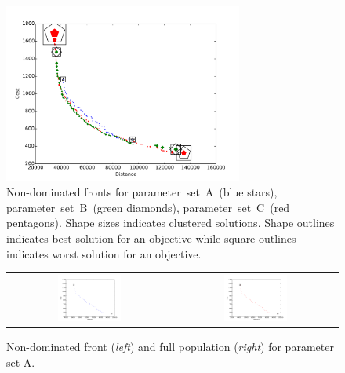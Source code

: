 \documentclass[paper=a4, fontsize=10pt]{scrartcl}
\begin{document}
\begin{figure}[H]
\centering
\includegraphics[width=0.7\textwidth]{figures/all-nd-fronts}
\caption{Non-dominated fronts for parameter~set~A~(blue stars), parameter~set~B~(green diamonds), parameter~set~C~(red pentagons). Shape sizes indicates clustered solutions. Shape outlines indicates best solution for an objective while square outlines indicates worst solution for an objective.}
\end{figure}

\begin{figure}[H]
\centering
\begin{tabular}{cc}
\includegraphics[width=0.4\textwidth]{figures/population-100-generations-200-group-0-2-crossover-0-8-mutation-0-005-run-4-front} &
\includegraphics[width=0.4\textwidth]{figures/population-100-generations-200-group-0-2-crossover-0-8-mutation-0-005-run-4-population} \\
\end{tabular}
\caption{Non-dominated front (\textit{left}) and full population (\textit{right}) for parameter set A.}
\end{figure}
\end{document}
